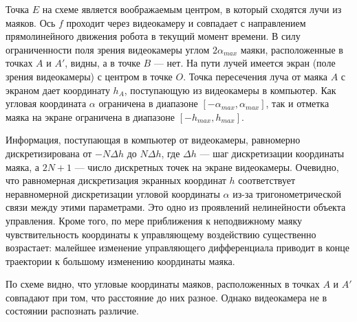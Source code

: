Точка $E$ на схеме является воображаемым центром, в который сходятся
лучи из маяков.  Ось $f$ проходит через видеокамеру и совпадает с
направлением прямолинейного движения робота в текущий момент времени.
В силу ограниченности поля зрения видеокамеры углом $2\alpha_{max}$
маяки, расположенные в точках $A$ и $A'$, видны, а в точке $B$ --- нет.
На пути лучей имеется экран (поле зрения видеокамеры) с центром в
точке $O$.  Точка пересечения луча от маяка $A$ с экраном дает
координату $h_A$, поступающую из видеокамеры в компьютер.  Как угловая
координата $\alpha$ ограничена в диапазоне $[-\alpha_{max},
\alpha_{max}]$, так и отметка маяка на экране ограничена в диапазоне
$[-h_{max}, h_{max}]$.

Информация, поступающая в компьютер от видеокамеры, равномерно
дискретизирована от $-N\Delta h$ до $N\Delta h$, где $\Delta h$ ---
шаг дискретизации координаты маяка, а $2N+1$ --- число дискретных
точек на экране видеокамеры.  Очевидно, что равномерная дискретизация
экранных координат $h$ соответствует неравномерной дискретизации
угловой координаты $\alpha$ из-за тригонометрической связи между этими
параметрами.  Это одно из проявлений нелинейности объекта управления.
Кроме того, по мере приближения к неподвижному маяку чувствительность
координаты к управляющему воздействию существенно возрастает: малейшее
изменение управляющего дифференциала приводит в конце траектории к
большому изменению координаты маяка.

По схеме видно, что угловые координаты маяков, расположенных в точках
$A$ и $A'$ совпадают при том, что расстояние до них разное.  Однако
видеокамера не в состоянии распознать различие.

